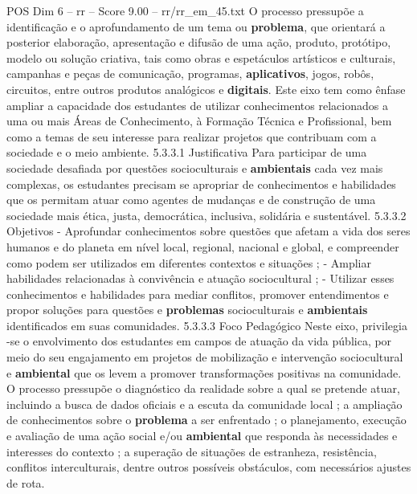 \begin{textsample}{POS Dim 6 – rr – Score 9.00 – rr/rr\_em\_45.txt}
O processo pressupõe a identificação e o aprofundamento de um tema ou \textbf{problema}, que orientará a posterior elaboração, apresentação e difusão de uma ação, produto, protótipo, modelo ou solução criativa, tais como obras e espetáculos artísticos e culturais, campanhas e peças de comunicação, programas, \textbf{aplicativos}, jogos, robôs, circuitos, entre outros produtos analógicos e \textbf{digitais}.
Este eixo tem como ênfase ampliar a capacidade dos estudantes de utilizar conhecimentos relacionados a uma ou mais Áreas de Conhecimento, à Formação Técnica e Profissional, bem como a temas de seu interesse para realizar projetos que contribuam com a sociedade e o meio ambiente. 5.3.3.1 Justificativa Para participar de uma sociedade desafiada por questões socioculturais e \textbf{ambientais} cada vez mais complexas, os estudantes precisam se apropriar de conhecimentos e habilidades que os permitam atuar como agentes de mudanças e de construção de uma sociedade mais ética, justa, democrática, inclusiva, solidária e sustentável. 5.3.3.2 Objetivos - Aprofundar conhecimentos sobre questões que afetam a vida dos seres humanos e do planeta em nível local, regional, nacional e global, e compreender como podem ser utilizados em diferentes contextos e situações ; - Ampliar habilidades relacionadas à convivência e atuação sociocultural ; - Utilizar esses conhecimentos e habilidades para mediar conflitos, promover entendimentos e propor soluções para questões e \textbf{problemas} socioculturais e \textbf{ambientais} identificados em suas comunidades. 5.3.3.3 Foco Pedagógico Neste eixo, privilegia -se o envolvimento dos estudantes em campos de atuação da vida pública, por meio do seu engajamento em projetos de mobilização e intervenção sociocultural e \textbf{ambiental} que os levem a promover transformações positivas na comunidade.
O processo pressupõe o diagnóstico da realidade sobre a qual se pretende atuar, incluindo a busca de dados oficiais e a escuta da comunidade local ; a ampliação de conhecimentos sobre o \textbf{problema} a ser enfrentado ; o planejamento, execução e avaliação de uma ação social e/ou \textbf{ambiental} que responda às necessidades e interesses do contexto ; a superação de situações de estranheza, resistência, conflitos interculturais, dentre outros possíveis obstáculos, com necessários ajustes de rota.

\end{textsample}
